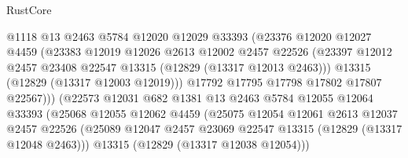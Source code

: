 \begin{lexlean}{RustCore}
\begin{coremodule}
                                @1118
                                @13
                                @2463
                                @5784
                                @12020
                                @12029
                                @33393
                                (@23376
                                  @12020
                                  @12027
                                  @4459
                                  (@23383
                                    @12019
                                    @12026
                                    @2613
                                    @12002
                                    @2457
                                    @22526
                                    (@23397
                                      @12012
                                      @2457
                                      @23408
                                      @22547
                                      @13315
                                      (@12829 (@13317 @12013 @2463)))
                                    @13315
                                    (@12829 (@13317 @12003 @12019)))
                                  @17792
                                  @17795
                                  @17798
                                  @17802
                                  @17807
                                  @22567)))
                            (@22573
                              @12031
                              @682
                              @1381
                              @13
                              @2463
                              @5784
                              @12055
                              @12064
                              @33393
                              (@25068
                                @12055
                                @12062
                                @4459
                                (@25075
                                  @12054
                                  @12061
                                  @2613
                                  @12037
                                  @2457
                                  @22526
                                  (@25089
                                    @12047
                                    @2457
                                    @23069
                                    @22547
                                    @13315
                                    (@12829 (@13317 @12048 @2463)))
                                  @13315
                                  (@12829 (@13317 @12038 @12054)))

\end{coremodule}
\end{lexlean}
